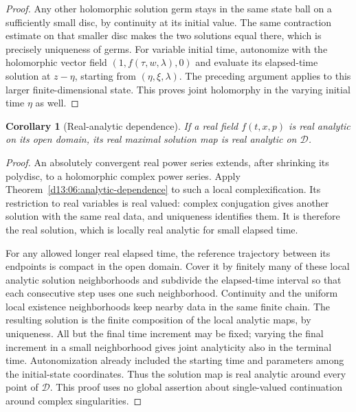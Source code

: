 \documentclass[11pt,oneside]{book}
\newtheorem{corollary}[theorem]{Corollary}
\theoremstyle{definition}
\theoremstyle{remark}\newtheorem{remark}[theorem]{Remark}
\begin{document}
\begin{proof}
Any other holomorphic solution germ stays in the same state ball on
a sufficiently small disc, by continuity at its initial value. The
same contraction estimate on that smaller disc makes the two
solutions equal there, which is precisely uniqueness of germs.
For variable initial time, autonomize with the holomorphic vector
field $(1,f(\tau,w,\lambda),0)$ and evaluate its elapsed-time solution
at $z-\eta$, starting from $(\eta,\xi,\lambda)$. The preceding
argument applies to this larger finite-dimensional state. This
proves joint holomorphy in the varying initial time $\eta$ as well.
\end{proof}

\begin{corollary}[Real-analytic dependence]\label{d13:06:real-analytic}
If a real field $f(t,x,p)$ is real analytic on its open domain, its
real maximal solution map is real analytic on $\mathcal D$.
\end{corollary}
\begin{proof}
An absolutely convergent real power series extends, after shrinking
its polydisc, to a holomorphic complex power series. Apply
Theorem~\ref{d13:06:analytic-dependence} to such a local
complexification. Its restriction to real variables is real valued:
complex conjugation gives another solution with the same real data,
and uniqueness identifies them. It is therefore the real solution,
which is locally real analytic for small elapsed time.

For any allowed longer real elapsed time, the reference trajectory
between its endpoints is compact in the open domain. Cover it by
finitely many of these local analytic solution neighborhoods and
subdivide the elapsed-time interval so that each consecutive step
uses one such neighborhood. Continuity and the uniform local
existence neighborhoods keep nearby data in the same finite chain.
The resulting solution is the finite composition of the local
analytic maps, by uniqueness. All but the final time increment may
be fixed; varying the final increment in a small neighborhood gives
joint analyticity also in the terminal time. Autonomization already
included the starting time and parameters among the initial-state
coordinates. Thus the solution map is real analytic around every
point of $\mathcal D$. This proof uses no global assertion about
single-valued continuation around complex singularities.
\end{proof}
\end{document}
